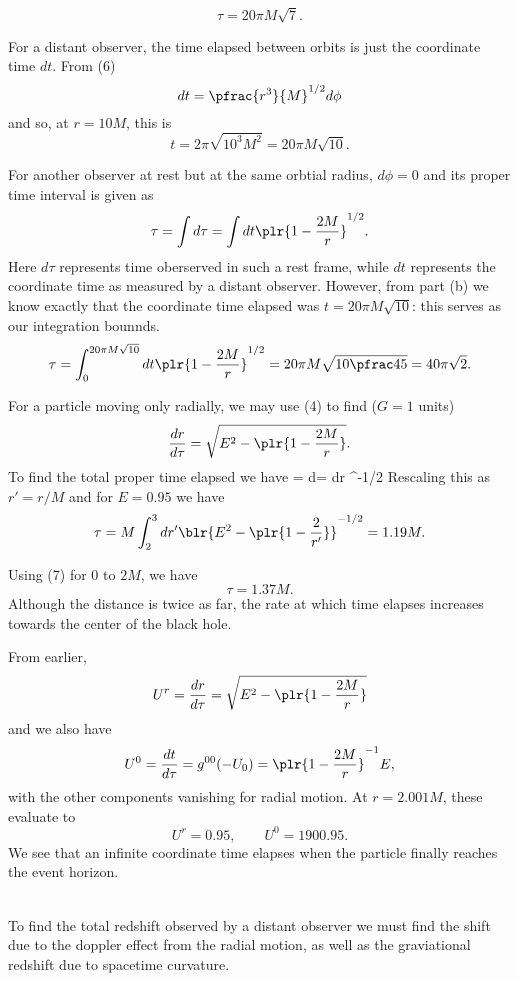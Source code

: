 \documentclass[10pt,letterpaper]{article}
\begin{document}
\[
	\tau = 20\pi M\sqrt 7.
\]
\item
For a distant observer, the time elapsed between orbits is just the coordinate time $dt$. From (6)
\[
	dt = \pfrac{r^3}{M}^{1/2}d\phi
\]
and so, at $r=10M$, this is
\[
	t = 2\pi \sqrt{ 10^3 M^2} = 20\pi M\sqrt{10}.
\]
\item
For another observer at rest but at the same orbtial radius, $d\phi =0$ and its proper time interval is given as
\[
	\tau = \int d\tau = \int dt\plr{1-\frac{2M}{r}}^{1/2}.
\]
Here $d\tau$ represents time oberserved in such a rest frame, while $dt$ represents the coordinate time as measured by a distant observer. However, from part (b) we know exactly that the coordinate time elapsed was $t = 20\pi M\sqrt{10}$: this serves as our integration bounnds.
\[
	\tau = \int_0^{20\pi M\sqrt{10}} dt \plr{1-\frac{2M}{r}}^{1/2} = 20\pi M \sqrt{10\pfrac45} = 40\pi \sqrt 2.
\]
\eenum
\item 
\benum
\item
For a particle moving only radially, we may use (4) to find ($G=1$ units)
\[
	\frac{dr}{d\tau} = \sqrt{E^2-\plr{1-\frac{2M}{r}}}.
\]
To find the total proper time elapsed we have
\be
	\tau = \int d\tau = \int dr ^{-1/2}
\ee
Rescaling this as $r' = r/M$ and for $E = 0.95$ we have
\[
	\tau =M \int_2^3 dr'\blr{E^2-\plr{1-\frac{2}{r'}}}^{-1/2} = 1.19M.
\]
\item 
Using (7) for $0$ to $2M$, we have
\[
	\tau = 1.37M.
\]
Although the distance is twice as far, the rate at which time elapses increases towards the center of the black hole. 
\item
From earlier, 
\[
	U^r = \frac{dr}{d\tau} = \sqrt{E^2-\plr{1-\frac{2M}{r}}}
\]
and we also have
\[
	U^0 = \frac{dt}{d\tau} = g^{00}(-U_0) = \plr{1-\frac{2M}{r}}^{-1}E,
\]
with the other components vanishing for radial motion. At $r = 2.001 M$, these evaluate to
\[
	U^r = 0.95,\qquad U^0 = 1900.95.
\]
We see that an infinite coordinate time elapses when the particle finally reaches the event horizon. \\ \\
\item
To find the total redshift observed by a distant observer we must find the shift due to the doppler effect from the radial motion, as well as the graviational redshift due to spacetime curvature.\\
\\
\end{document}
